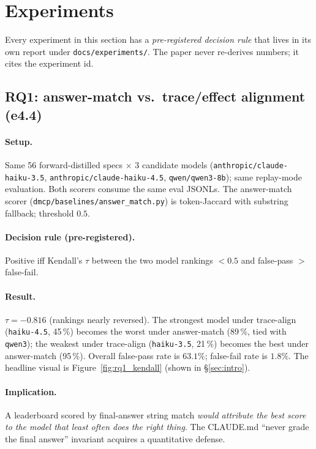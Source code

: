 \section{Experiments}
\label{sec:experiments}

Every experiment in this section has a \emph{pre-registered decision
rule} that lives in its own report under \texttt{docs/experiments/}.
The paper never re-derives numbers; it cites the experiment id.

\subsection{RQ1: answer-match vs.\ trace/effect alignment (e4.4)}
\label{sec:rq1}

\paragraph{Setup.} Same 56 forward-distilled specs $\times$ 3 candidate
models (\texttt{anthropic/claude-haiku-3.5},
\texttt{anthropic/claude-haiku-4.5}, \texttt{qwen/qwen3-8b}); same
replay-mode evaluation. Both scorers consume the same eval JSONLs. The
answer-match scorer
(\texttt{dmcp/baselines/answer\_match.py}) is token-Jaccard with
substring fallback; threshold $0.5$.

\paragraph{Decision rule (pre-registered).} Positive iff Kendall's
$\tau$ between the two model rankings $< 0.5$ and false-pass $>$
false-fail.

\paragraph{Result.} $\tau = \mathbf{-0.816}$ (rankings nearly reversed).
The strongest model under trace-align (\texttt{haiku-4.5}, 45\,\%)
becomes the worst under answer-match (89\,\%, tied with \texttt{qwen3});
the weakest under trace-align (\texttt{haiku-3.5}, 21\,\%) becomes the
best under answer-match (95\,\%). Overall false-pass rate is
$\mathbf{63.1\%}$; false-fail rate is $\mathbf{1.8\%}$. The headline
visual is Figure~\ref{fig:rq1_kendall} (shown in \S\ref{sec:intro}).

\paragraph{Implication.} A leaderboard scored by final-answer string
match \emph{would attribute the best score to the model that least
often does the right thing}. The CLAUDE.md ``never grade the final
answer'' invariant acquires a quantitative defense.

